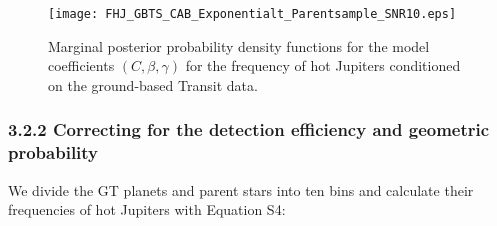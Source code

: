 \documentclass[twocolumn]{pnas-new}
\begin{document}
\begin{figure}[!t]
\centering
\texttt{[image: FHJ\_GBTS\_CAB\_Exponentialt\_Parentsample\_SNR10.eps]}
\caption{Marginal posterior probability density functions for the model coefficients $(C, \beta, \gamma)$ for the frequency of hot Jupiters conditioned on the ground-based Transit data.
\label{figFHJfittingFeHAgeGBTS}}
\end{figure}

\subsubsection*{3.2.2 Correcting for the detection efficiency and geometric probability}
\label{sec.obs.GBTS.debias}
We divide the GT planets and parent stars into ten bins and calculate their frequencies of hot Jupiters with Equation S4:
\end{document}
